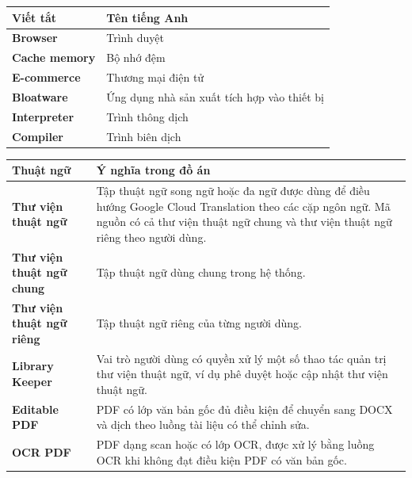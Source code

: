 \documentclass[../DoAn.tex]{subfiles}
\begin{document}
\begin{longtable}{l p{14cm}}
	\hline
   \textbf{Viết tắt}  & \textbf{Tên tiếng Anh} \\ \hline 
	\textbf{Browser} & Trình duyệt \\
	\textbf{Cache memory} & Bộ nhớ đệm \\
	\textbf{E-commerce} & Thương mại điện tử \\
	\textbf{Bloatware} & Ứng dụng nhà sản xuất tích hợp vào thiết bị \\
	\textbf{Interpreter}  &  Trình thông dịch \\
    \textbf{Compiler}  &  Trình biên dịch \\

    \hline
\end{longtable}

\begin{longtable}{l p{14cm}}
    \hline
   \textbf{Thuật ngữ}  & \textbf{Ý nghĩa trong đồ án} \\ \hline
    \textbf{Thư viện thuật ngữ} & Tập thuật ngữ song ngữ hoặc đa ngữ được dùng để điều hướng Google Cloud Translation theo các cặp ngôn ngữ. Mã nguồn có cả thư viện thuật ngữ chung và thư viện thuật ngữ riêng theo người dùng. \\
    \textbf{Thư viện thuật ngữ chung} & Tập thuật ngữ dùng chung trong hệ thống. \\
    \textbf{Thư viện thuật ngữ riêng} & Tập thuật ngữ riêng của từng người dùng. \\
    \textbf{Library Keeper} & Vai trò người dùng có quyền xử lý một số thao tác quản trị thư viện thuật ngữ, ví dụ phê duyệt hoặc cập nhật thư viện thuật ngữ. \\
    \textbf{Editable PDF} & PDF có lớp văn bản gốc đủ điều kiện để chuyển sang DOCX và dịch theo luồng tài liệu có thể chỉnh sửa. \\
    \textbf{OCR PDF} & PDF dạng scan hoặc có lớp OCR, được xử lý bằng luồng OCR khi không đạt điều kiện PDF có văn bản gốc. \\
    \hline
\end{longtable}
\end{document}
